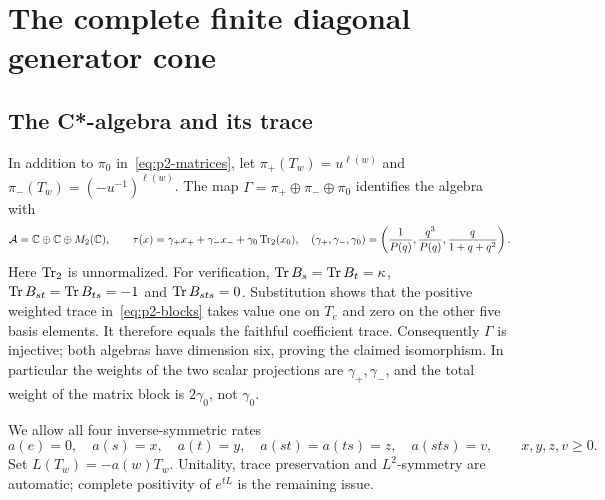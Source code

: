 \section{The complete finite diagonal generator cone}
\subsection{The C*-algebra and its trace}
In addition to $\pi_0$ in~\eqref{eq:p2-matrices}, let
$\pi_+(T_w)=u^{\ell(w)}$ and $\pi_-(T_w)=(-u^{-1})^{\ell(w)}$.
The map $\Gamma=\pi_+\oplus\pi_-\oplus\pi_0$ identifies the algebra with
\begin{equation}\label{eq:p2-blocks}
 \mathcal A=\mathbb C\oplus\mathbb C\oplus M_2(\mathbb C),\qquad
 \tau(x)=\gamma_+x_++\gamma_-x_-+\gamma_0\operatorname{Tr}_2(x_0),
 \quad
 (\gamma_+,\gamma_-,\gamma_0)=
 \left(\frac1{P(q)},\frac{q^3}{P(q)},\frac q{1+q+q^2}\right).
\end{equation}
Here $\operatorname{Tr}_2$ is unnormalized. For verification, $\operatorname{Tr} B_s=\operatorname{Tr} B_t=\kappa$,
$\operatorname{Tr} B_{st}=\operatorname{Tr} B_{ts}=-1$ and $\operatorname{Tr} B_{sts}=0$. Substitution shows that
the positive weighted trace in~\eqref{eq:p2-blocks} takes value one on
$T_e$ and zero on the other five basis elements. It therefore equals
the faithful coefficient trace. Consequently $\Gamma$ is injective;
both algebras have dimension six, proving the claimed isomorphism.
In particular the weights of the two scalar projections are
$\gamma_+,\gamma_-$, and the total weight of the matrix block is
$2\gamma_0$, not $\gamma_0$.

We allow all four inverse-symmetric rates
\begin{equation}\label{eq:p2-rates}
 a(e)=0,\quad a(s)=x,\quad a(t)=y,\quad
 a(st)=a(ts)=z,\quad a(sts)=v,\qquad x,y,z,v\geq0.
\end{equation}
Set $L(T_w)=-a(w)T_w$. Unitality, trace preservation and $L^2$-symmetry
are automatic; complete positivity of $e^{tL}$ is the remaining issue.

